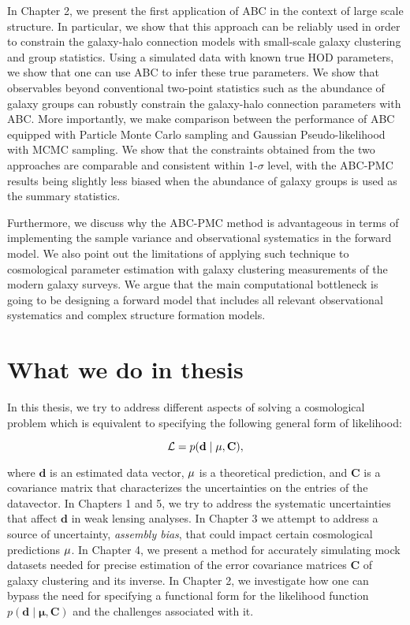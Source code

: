 In Chapter 2, we present the first application of ABC in the context of large scale structure. In particular, we show that this approach can be reliably used in order to constrain 
the galaxy-halo connection models with small-scale galaxy clustering and group statistics. Using a simulated data with known true HOD parameters, we show that one can use ABC to infer these true parameters. We show that observables beyond conventional two-point statistics such as the abundance of galaxy groups can robustly constrain the galaxy-halo connection parameters with ABC. More importantly, we make comparison between the performance of ABC equipped with Particle Monte Carlo sampling and Gaussian Pseudo-likelihood with MCMC sampling. We show that the constraints obtained from the two approaches are comparable and consistent within 1-$\sigma$ level, with the ABC-PMC results being slightly less 
biased when the abundance of galaxy groups is used as the summary statistics. 

Furthermore, we discuss why the ABC-PMC method is advantageous in terms of implementing the sample variance and observational systematics in the forward model.
We also point out the limitations of applying such technique to cosmological parameter estimation with galaxy clustering measurements of the modern galaxy surveys. 
We argue that the main computational bottleneck is going to be designing a forward model that includes all relevant observational systematics and complex structure formation models. 

\section{What we do in thesis}

In this thesis, we try to address different aspects of solving a cosmological problem which is equivalent to specifying the following general form of likelihood:

\begin{equation}
\mathcal{L} = p(\mathbf{d} \; | \; \bf{\mu} , \mathbf{C}),
\end{equation}

where $\mathbf{d}$ is an estimated data vector, $\bf{\mu}$ is a theoretical prediction, and $\mathbf{C}$ is a covariance matrix that characterizes the uncertainties on the entries of the datavector. In Chapters 1 and 5, we try to address the systematic uncertainties that affect $\mathbf{d}$ in weak lensing analyses. In Chapter 3 we attempt to address a source of uncertainty, \emph{assembly bias}, that could impact certain cosmological predictions $\bf{\mu}$. In Chapter 4, we present a method for accurately simulating mock datasets needed for precise estimation of the error covariance matrices $\mathbf{C}$ of galaxy clustering and its inverse. In Chapter 2, we investigate how one can bypass the need for specifying a functional form for the likelihood function $p(\mathbf{d} \; | \; \mathbf{\mu} , \mathbf{C})$ and the challenges associated with it.


